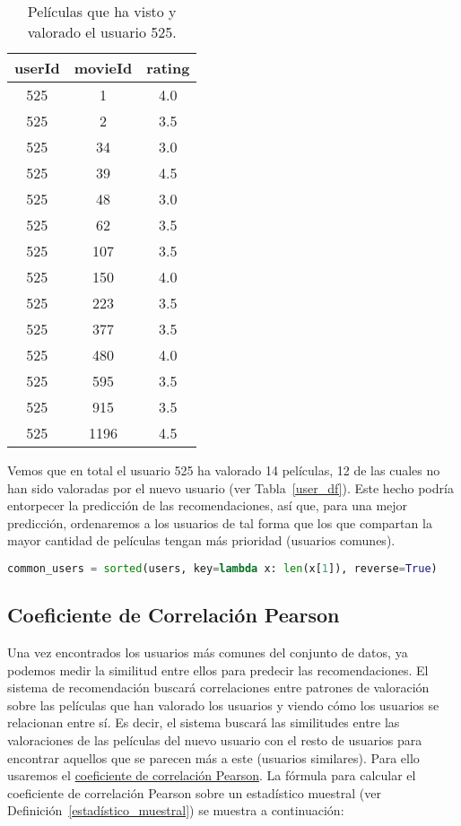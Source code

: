 \documentclass{uimppracticas}
\begin{document}
\begin{table}[H]
	\centering
	\begin{tabular}{ccc}
		\toprule
		userId &  movieId &  rating \\
		\midrule
		525 &        1 &     4.0 \\
		525 &        2 &     3.5 \\
		525 &       34 &     3.0 \\
		525 &       39 &     4.5 \\
		525 &       48 &     3.0 \\
		525 &       62 &     3.5 \\
		525 &      107 &     3.5 \\
		525 &      150 &     4.0 \\
		525 &      223 &     3.5 \\
		525 &      377 &     3.5 \\
		525 &      480 &     4.0 \\
		525 &      595 &     3.5 \\
		525 &      915 &     3.5 \\
		525 &     1196 &     4.5 \\
		\bottomrule
	\end{tabular}
	\caption{Películas que ha visto y valorado el usuario 525.}
	\label{user_525}
\end{table}

Vemos que en total el usuario 525 ha valorado 14 películas, 12 de las cuales no han sido valoradas por el nuevo usuario (ver Tabla~\ref{user_df}). Este hecho podría entorpecer la predicción de las recomendaciones, así que, para una mejor predicción, ordenaremos a los usuarios de tal forma que los que compartan la mayor cantidad de películas tengan más prioridad (usuarios comunes).

\begin{lstlisting}[language=python, basicstyle=\footnotesize, belowskip=-0.5 \baselineskip]
common_users = sorted(users, key=lambda x: len(x[1]), reverse=True)
\end{lstlisting}

\subsection{Coeficiente de Correlación Pearson}\label{correlacion_pearson}

Una vez encontrados los usuarios más comunes del conjunto de datos, ya podemos medir la similitud entre ellos para predecir las recomendaciones. El sistema de recomendación buscará correlaciones entre patrones de valoración sobre las películas que han valorado los usuarios y viendo cómo los usuarios se relacionan entre sí. Es decir, el sistema buscará las similitudes entre las valoraciones de las películas del nuevo usuario con el resto de usuarios para encontrar aquellos que se parecen más a este (usuarios similares). Para ello usaremos el \href{https://es.wikipedia.org/wiki/Coeficiente_de_correlaci\%C3\%B3n_de_Pearson}{coeficiente de correlación Pearson}. La fórmula para calcular el coeficiente de correlación Pearson sobre un estadístico muestral (ver Definición~\ref{estadístico_muestral}) se muestra a continuación:
\end{document}
